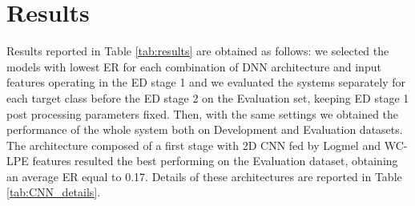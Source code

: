 \section{Results}
Results reported in Table \ref{tab:results} are obtained as follows: we selected the models with lowest ER for each combination of DNN architecture and input features operating in the ED stage 1 and we evaluated the systems separately for each target class before the ED stage 2 on the Evaluation set, keeping ED stage 1 post processing parameters fixed. Then, with the same settings we obtained the performance of the whole system both on Development and Evaluation datasets. The architecture composed of a first stage with 2D CNN fed by Logmel and WC-LPE features resulted the best performing on the Evaluation dataset, obtaining an average ER equal to 0.17.
Details of these architectures are reported in Table \ref{tab:CNN_details}.

